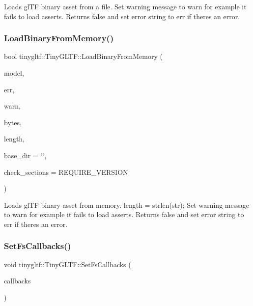 Loads gl\+TF binary asset from a file. Set warning message to {\ttfamily warn} for example it fails to load asserts. Returns false and set error string to {\ttfamily err} if there\textquotesingle{}s an error. \mbox{\label{classtinygltf_1_1TinyGLTF_a363def44f18e944fa49e0cebe8f1b5b6}} 
\subsubsection{\texorpdfstring{Load\+Binary\+From\+Memory()}{LoadBinaryFromMemory()}}
{\footnotesize\ttfamily bool tinygltf\+::\+Tiny\+G\+L\+T\+F\+::\+Load\+Binary\+From\+Memory (\begin{DoxyParamCaption}\item[{\hyperlink{classtinygltf_1_1Model}{Model} $\ast$}]{model,  }\item[{std\+::string $\ast$}]{err,  }\item[{std\+::string $\ast$}]{warn,  }\item[{const unsigned char $\ast$}]{bytes,  }\item[{const unsigned int}]{length,  }\item[{const std\+::string \&}]{base\+\_\+dir = {\ttfamily \char`\"{}\char`\"{}},  }\item[{unsigned int}]{check\+\_\+sections = {\ttfamily REQUIRE\+\_\+VERSION} }\end{DoxyParamCaption})}

Loads gl\+TF binary asset from memory. {\ttfamily length} = strlen(str); Set warning message to {\ttfamily warn} for example it fails to load asserts. Returns false and set error string to {\ttfamily err} if there\textquotesingle{}s an error. \mbox{\label{classtinygltf_1_1TinyGLTF_a92551e51e5c2ef62545accbdf3055e3d}} 
\subsubsection{\texorpdfstring{Set\+Fs\+Callbacks()}{SetFsCallbacks()}}
{\footnotesize\ttfamily void tinygltf\+::\+Tiny\+G\+L\+T\+F\+::\+Set\+Fs\+Callbacks (\begin{DoxyParamCaption}\item[{\hyperlink{structtinygltf_1_1FsCallbacks}{Fs\+Callbacks}}]{callbacks }\end{DoxyParamCaption})}

